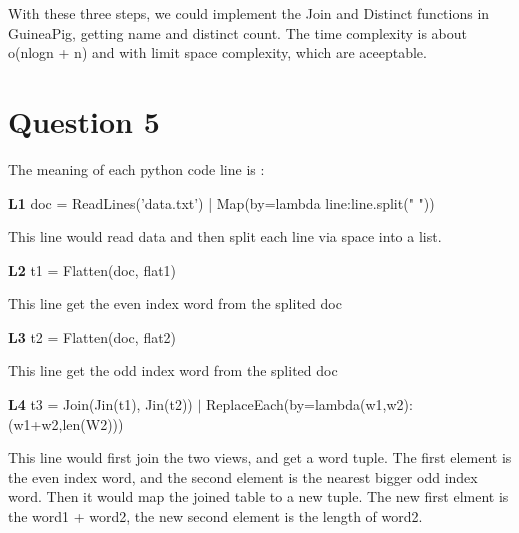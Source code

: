 \documentclass{article} %
\begin{document}
With these three steps, we could implement the Join and Distinct functions in
GuineaPig, getting name and distinct count. The time complexity is about
o(nlogn + n) and with limit space complexity, which are aceeptable.


\section{Question 5}
The meaning of each python code line is :


\textbf{L1} doc = ReadLines('data.txt') | Map(by=lambda line:line.split(" "))

\qquad This line would read data and then split each line via space into a list.

\textbf{L2} t1 = Flatten(doc, flat1)

\qquad This line get the even index word from the splited doc

\textbf{L3} t2 = Flatten(doc, flat2)

\qquad This line get the odd index word from the splited doc

\textbf{L4} t3 = Join(Jin(t1), Jin(t2)) $\mid$ ReplaceEach(by=lambda(w1,w2):(w1+w2,len(W2)))

\qquad This line would first join the two views, and get a word tuple. The first
element is the even index word, and the second element is the nearest bigger odd
index word. Then it would map the joined table to a new tuple. The new first
elment is the word1 + word2, the new second element is the length of word2.
\end{document}
